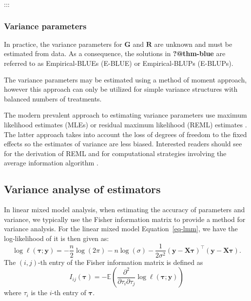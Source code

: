 \documentclass[
  a4paper,
  oneside,
  openany,
  12pt,
  onecolumn]{book}
\theoremstyle{definition}
\theoremstyle{definition}
\theoremstyle{plain}
\theoremstyle{remark}
\begin{document}
:::

\subsubsection{Variance parameters}\label{variance-parameters}

In practice, the variance parameters for \(\boldsymbol{G}\) and
\(\boldsymbol{R}\) are unknown and must be estimated from data. As a
consequence, the solutions in \textbf{?@thm-blue} are referred to as
Empirical-BLUEs (E-BLUE) or Empirical-BLUPs (E-BLUPs).

The variance parameters may be estimated using a method of moment
approach, however this approach can only be utilized for simple variance
structures with balanced numbers of treatments.

The modern prevalent approach to estimating variance parameters use
maximum likelihood estimates (MLEs) or residual maximum likelihood
(REML) estimates \citep{pattersonRecoveryInterblockInformation1971}. The
latter approach takes into account the loss of degrees of freedom to the
fixed effects so the estimates of variance are less biased. Interested
readers should see \citet{verbylaConditionalDerivationResidual1990} for
the derivation of REML and \citet{smithMultiplicativeMixedModels1999}
for computational strategies involving the average information algorithm
\citep{gilmourAverageInformationREML1995, johnsonRestrictedMaximumLikelihood1995}.

\subsection{Variance analyse of
estimators}\label{variance-analyse-of-estimators}

In linear mixed model analysis, when estimating the accuracy of
parameters and variance, we typically use the Fisher information matrix
to provide a method for variance analysis. For the linear mixed model
Equation~\ref{eq-lmm}, we have the log-likelihood of it is then given
as: \[
\log\ell(\boldsymbol{\tau};\boldsymbol{y}) = -\frac{n}{2}\log(2\pi)-n\log(\sigma)-\frac{1}{2\sigma^2}(\boldsymbol{y}-\boldsymbol{X}\boldsymbol{\tau})^\top(\boldsymbol{y}-\boldsymbol{X}\boldsymbol{\tau}).
\] The \((i,j)\)-th entry of the Fisher information matrix is defined as
\[
I_{ij}(\boldsymbol{\tau})=-\mathbb{E}\left(\frac{\partial^2}{\partial\tau_i\partial\tau_j}\log\ell(\boldsymbol{\tau};\boldsymbol{y})\right)
\] where \(\tau_i\) is the \(i\)-th entry of \(\boldsymbol{\tau}\).
\end{document}
